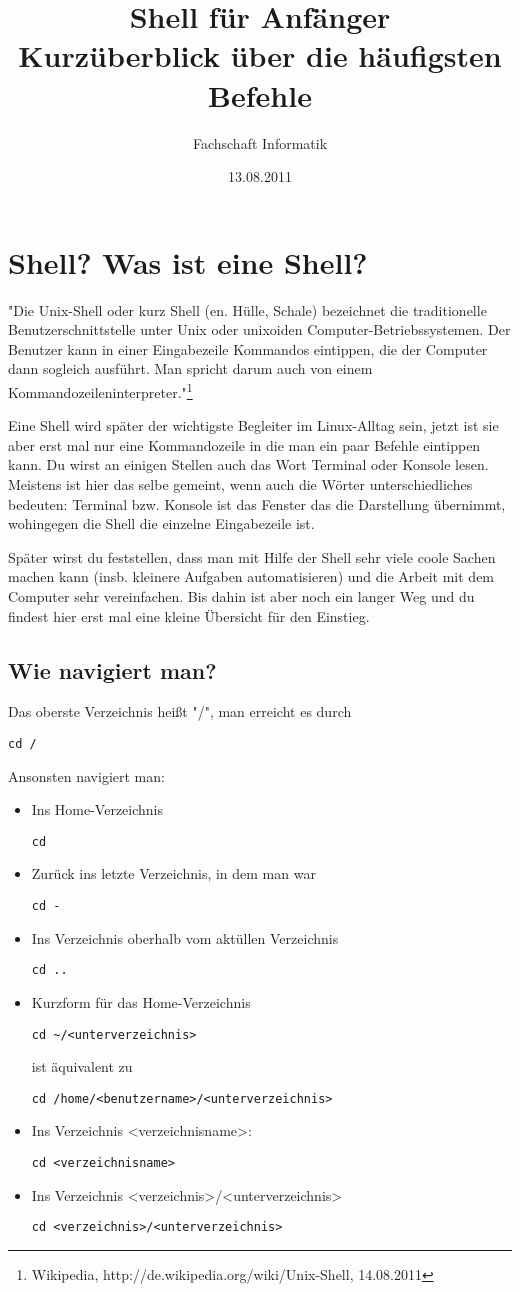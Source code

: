 \documentclass[a4paper,10pt]{article}
\title{Shell für Anfänger\\
\large{Kurzüberblick über die häufigsten Befehle}}
\author{Fachschaft Informatik}
\date{13.08.2011}
\newcommand{\befehl}[1]{
  \begin{center}
    \texttt{#1}
  \end{center}
}
\begin{document}
  \maketitle

  \tableofcontents
  \pagebreak
  \parindent 0pt
  \parskip 10pt
  \section{Shell? Was ist eine Shell?}
    "Die Unix-Shell oder kurz Shell (en. Hülle, Schale) bezeichnet die traditionelle Benutzerschnittstelle unter Unix oder unixoiden Computer-Betriebssystemen. Der Benutzer kann in einer Eingabezeile Kommandos eintippen, die der Computer dann sogleich ausführt. Man spricht darum auch von einem Kommandozeileninterpreter."\footnote{Wikipedia, http://de.wikipedia.org/wiki/Unix-Shell, 14.08.2011}

    Eine Shell wird später der wichtigste Begleiter im Linux-Alltag sein, jetzt ist sie aber erst mal nur eine Kommandozeile in die man ein paar Befehle eintippen kann. Du wirst an einigen Stellen auch das Wort Terminal oder Konsole lesen. Meistens ist hier das selbe gemeint, wenn auch die Wörter unterschiedliches bedeuten: Terminal bzw. Konsole ist das Fenster das die Darstellung übernimmt, wohingegen die Shell die einzelne Eingabezeile ist.

    Später wirst du feststellen, dass man mit Hilfe der Shell sehr viele coole Sachen machen kann (insb. kleinere Aufgaben automatisieren) und die Arbeit mit dem Computer sehr vereinfachen. Bis dahin ist aber noch ein langer Weg und du findest hier erst mal eine kleine Übersicht für den Einstieg.
    \subsection{Wie navigiert man?}
      Das oberste Verzeichnis heißt "/", man erreicht es durch 
      \befehl{cd /}
      Ansonsten navigiert man:
      \begin{itemize}
	\item Ins Home-Verzeichnis 
	  \befehl{cd}
	\item Zurück ins letzte Verzeichnis, in dem man war 
	  \befehl{cd -}
	\item Ins Verzeichnis oberhalb vom aktüllen Verzeichnis 
	  \befehl{cd ..} 
	\item  Kurzform für das Home-Verzeichnis 
	  \befehl{cd \textasciitilde/<unterverzeichnis>} 
	  ist äquivalent zu 
	  \befehl{cd /home/<benutzername>/<unterverzeichnis>}
	\item Ins Verzeichnis <verzeichnisname>: 
	  \befehl{cd <verzeichnisname>}
	\item Ins Verzeichnis <verzeichnis>/<unterverzeichnis> 
	  \befehl{cd <verzeichnis>/<unterverzeichnis>}
      \end{itemize}
\end{document}
